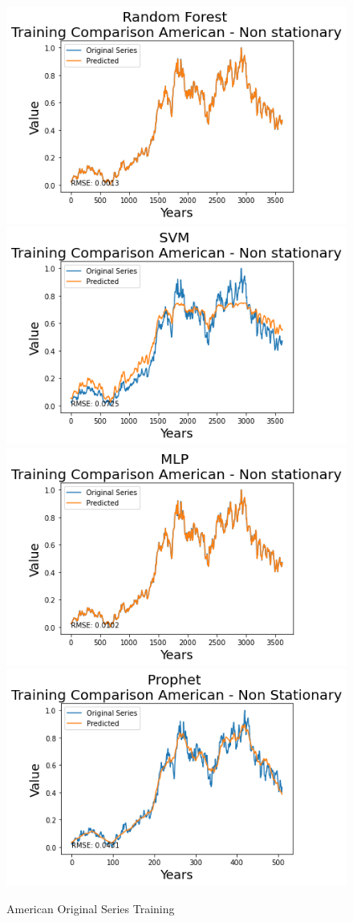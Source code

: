 \documentclass[10pt,twocolumn,letterpaper]{article}
\begin{document}
	\begin{figure}[h]
		\centering
		\includegraphics[width=0.45\linewidth]{../img/RandomForest/american_training}
		\includegraphics[width=0.45\linewidth]{../img/SVM/american_training}
		\includegraphics[width=0.45\linewidth]{../img/MLP/american_training}
		\includegraphics[width=0.45\linewidth]{../img/Prophet/american_training}
		\caption{American Original Series Training}
		\label{fig:americantraining}
	\end{figure}
	
\end{document}
